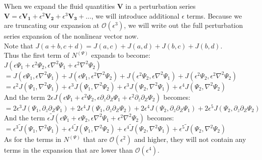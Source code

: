 \documentclass[letterpaper,12pt]{article}
\begin{document}
When we expand the fluid quantities $\mathbf{V}$ in a perturbation series $\mathbf{V} = \epsilon\mathbf{V_1} + \epsilon^2\mathbf{V_2} + \epsilon^3\mathbf{V_3} + ...$, we will introduce additional $\epsilon$ terms. Because we are truncating our expansion at $\mathcal{O}(\epsilon^3)$, we will write out the full perturbation series expansion of the nonlinear vector now. \\

Note that $J\left(a + b, c + d\right) = J(a, c) + J(a, d) + J(b, c) + J(b, d)$. \\

Thus the first term of $N^{\left(\Psi\right)}$ expands to become: \\

$J(\epsilon\Psi_1 + \epsilon^2\Psi_2, \epsilon\nabla^2 \Psi_1 + \epsilon^2 \nabla^2\Psi_2)$ \\

$= J(\epsilon\Psi_1, \epsilon\nabla^2\Psi_1) + J(\epsilon\Psi_1, \epsilon^2\nabla^2\Psi_2) + J(\epsilon^2\Psi_2, \epsilon\nabla^2\Psi_1) + J(\epsilon^2\Psi_2, \epsilon^2\nabla^2\Psi_2)$ \\

$= \epsilon^2 J(\Psi_1, \nabla^2\Psi_1) + \epsilon^3J(\Psi_1, \nabla^2\Psi_2) + \epsilon^3J(\Psi_2, \nabla^2\Psi_1) + \epsilon^4J(\Psi_2, \nabla^2\Psi_2)$ \\

And the term $2\epsilon J(\epsilon\Psi_1 + \epsilon^2\Psi_2, \epsilon\partial_z\partial_Z\Psi_1 + \epsilon^2\partial_z\partial_Z\Psi_2)$ becomes: \\

$= 2\epsilon^3 J(\Psi_1, \partial_z\partial_Z\Psi_1) + 2\epsilon^4 J(\Psi_1, \partial_z\partial_Z\Psi_2) + 2\epsilon^4 J(\Psi_2, \partial_z\partial_Z\Psi_1) + 2\epsilon^5 J(\Psi_2, \partial_z\partial_Z \Psi_2)$ \\

And the term $\epsilon \widetilde{J}(\epsilon\Psi_1 + \epsilon\Psi_2, \epsilon\nabla^2\Psi_1 + \epsilon^2\nabla^2\Psi_2)$ becomes: \\

$= \epsilon^3 \widetilde{J}(\Psi_1, \nabla^2 \Psi_1) + \epsilon^4\widetilde{J}(\Psi_1, \nabla^2\Psi_2) + \epsilon^4\widetilde{J}(\Psi_2, \nabla^2\Psi_1) + \epsilon^5\widetilde{J}(\Psi_2, \nabla^2 \Psi_2)$ \\

As for the terms in $N^{(\Psi)}$ that are $\mathcal{O}(\epsilon^2)$ and higher, they will not contain any terms in the expansion that are lower than $\mathcal{O}(\epsilon^4)$. \\
\end{document}
